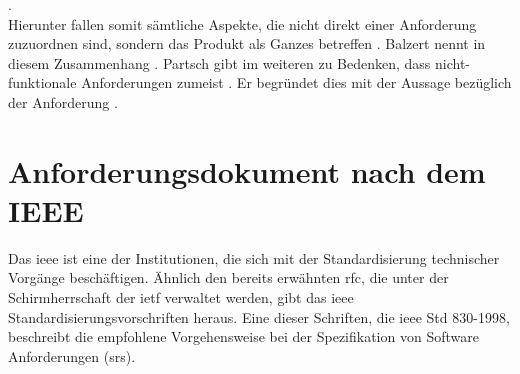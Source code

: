  \citep[][S. 27 f.]{Partsch2010}.\\
Hierunter fallen somit sämtliche Aspekte, die nicht direkt einer Anforderung zuzuordnen sind, sondern das Produkt als Ganzes betreffen \citep[vgl.][463]{Balzert2010}. 
Balzert nennt in diesem Zusammenhang  \citep[][463]{Balzert2010}. 
Partsch gibt im weiteren zu Bedenken, dass nicht-funktionale Anforderungen zumeist  \citep[][30]{Partsch2010}. Er begründet dies mit der Aussage bezüglich der Anforderung  \citep[][30]{Partsch2010}.




\section{Anforderungsdokument nach dem IEEE}
Das \ac{ieee} ist eine der Institutionen, die sich mit der Standardisierung technischer Vorgänge beschäftigen. Ähnlich den bereits erwähnten \ac{rfc}, die unter der Schirmherrschaft der \ac{ietf} verwaltet werden, gibt das \ac{ieee} Standardisierungsvorschriften heraus. Eine dieser Schriften, die \ac{ieee} Std 830-1998, beschreibt die empfohlene Vorgehensweise bei der Spezifikation von Software Anforderungen (\ac{srs}).

